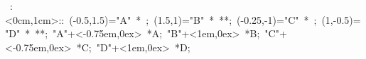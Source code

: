 
\hbox{
\xy    <1cm,0cm>:<0cm,1cm>::
       (-0.5,1.5)="A" *{\bullet}  ; (1.5,1)="B" *{\bullet}  **\dir{-};
       (-0.25,-1)="C" *{\bullet}  ; (1,-0.5)="D" *{\bullet}  **\dir{-};
       "A"+<-0.75em,0ex> *{A};
       "B"+<1em,0ex> *{B};
       "C"+<-0.75em,0ex> *{C};
       "D"+<1em,0ex> *{D};
       \endxy}
